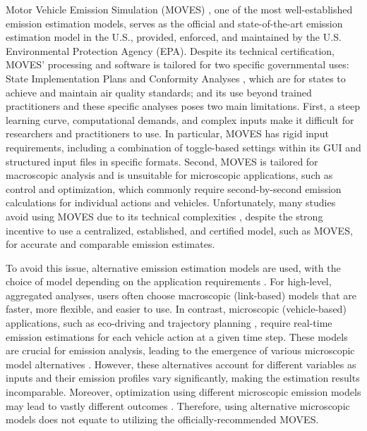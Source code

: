 \documentclass[12pt,english]{article}
\begin{document}
Motor Vehicle Emission Simulation (MOVES) \citep{USEPA_Motor_Vehicle_Emission_2022}, one of the most well-established emission estimation models, serves as the official and state-of-the-art emission estimation model in the U.S., provided, enforced, and maintained by the U.S. Environmental Protection Agency (EPA).
Despite its technical certification, MOVES' processing and software is tailored for two specific governmental uses: State Implementation Plans and Conformity Analyses \cite{EPA2021MOVES3}, which are for states to achieve and maintain air quality standards; and its use beyond trained practitioners and these specific analyses poses two main limitations.
First, a steep learning curve, computational demands, and complex inputs make it difficult for researchers and practitioners to use. 
In particular, MOVES has rigid input requirements, including a combination of toggle-based settings within its GUI and structured input files in specific formats. %
Second, MOVES is tailored for macroscopic analysis and is unsuitable for microscopic applications, such as control and optimization, which commonly require second-by-second emission calculations for individual actions and vehicles.
%
Unfortunately, many studies avoid using MOVES due to its technical complexities \citep{ravindra2006assessment,Kopfer2014ReducingGG,Zhao2018APB,wu2019tracking,Kou2020QuantifyingGG,Bai2022HybridRL,tsanakas2022generating}, despite the strong incentive to use a centralized, established, and certified model, such as MOVES, for accurate and comparable emission estimates. 



To avoid this issue, alternative emission estimation models are used, with the choice of model depending on the application requirements \citep{8691686}. 
For high-level, aggregated analyses, users often choose macroscopic (link-based) models that are faster, more flexible, and easier to use. 
In contrast, microscopic (vehicle-based) applications, such as eco-driving \citep{mintsis2020dynamic,wu2019tracking} and trajectory planning \citep{10057033}, require real-time emission estimations for each vehicle action at a given time step. These models are crucial for emission analysis, leading to the emergence of various microscopic model alternatives \citep{Rakha_2011, hbefa, mkadziel2023vehicle}.
However, these alternatives account for different variables as inputs and their emission profiles vary significantly, making the estimation results incomparable. Moreover, optimization using different microscopic emission models may lead to vastly different outcomes \citep{Pre_VT_ecodirivng}. Therefore, using alternative microscopic models does not equate to utilizing the officially-recommended MOVES.%
\end{document}
